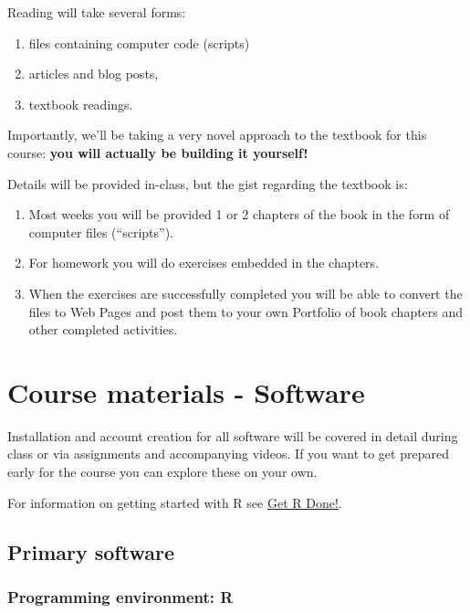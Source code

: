 \documentclass[
]{book}
\providecommand{\tightlist}{%
  \setlength{\itemsep}{0pt}\setlength{\parskip}{0pt}}
\begin{document}
Reading will take several forms:

\begin{enumerate}
\def\labelenumi{\arabic{enumi}.}
\tightlist
\item
  files containing computer code (scripts)
\item
  articles and blog posts,
\item
  textbook readings.
\end{enumerate}

Importantly, we'll be taking a very novel approach to the textbook for this course: \textbf{you will actually be building it yourself!}

Details will be provided in-class, but the gist regarding the textbook is:

\begin{enumerate}
\def\labelenumi{\arabic{enumi}.}
\tightlist
\item
  Most weeks you will be provided 1 or 2 chapters of the book in the form of computer files (``scripts'').
\item
  For homework you will do exercises embedded in the chapters.
\item
  When the exercises are successfully completed you will be able to convert the files to Web Pages and post them to your own Portfolio of book chapters and other completed activities.
\end{enumerate}

\hypertarget{course-materials---software}{%
\chapter{Course materials - Software}\label{course-materials---software}}

Installation and account creation for all software will be covered in detail during class or via assignments and accompanying videos. If you want to get prepared early for the course you can explore these on your own.

For information on getting started with R see \href{https://brouwern.github.io/getRdone/}{Get R Done!}.

\hypertarget{primary-software}{%
\section{Primary software}\label{primary-software}}

\hypertarget{programming-environment-r}{%
\subsection{Programming environment: R}\label{programming-environment-r}}
\end{document}
